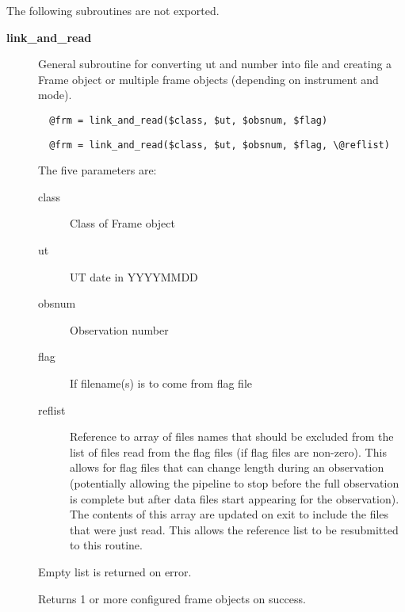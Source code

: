 The following subroutines are not exported.

\begin{description}

\item[{\textbf{link\_and\_read}}] \mbox{}

General subroutine for converting ut and number into file
and creating a Frame object or multiple frame objects (depending
on instrument and mode).

\begin{verbatim}
  @frm = link_and_read($class, $ut, $obsnum, $flag)
\end{verbatim}
\begin{verbatim}
  @frm = link_and_read($class, $ut, $obsnum, $flag, \@reflist)
\end{verbatim}


The five parameters are:

\begin{description}

\item[{class}] \mbox{}

Class of Frame object


\item[{ut}] \mbox{}

UT date in YYYYMMDD


\item[{obsnum}] \mbox{}

Observation number


\item[{flag}] \mbox{}

If filename(s) is to come from flag file


\item[{reflist}] \mbox{}

Reference to array of files names that should be excluded from
the list of files read from the flag files (if flag files are non-zero).
This allows for flag files that can change length during an observation
(potentially allowing the pipeline to stop before the full observation
is complete but after data files start appearing for the observation).
The contents of this array are updated on exit to include the files that
were just read. This allows the reference list to be resubmitted
to this routine.

\end{description}


Empty list is returned on error.



Returns 1 or more configured frame objects on success.



\end{description}
